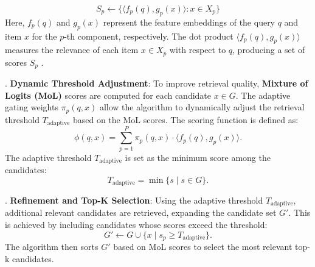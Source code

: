 \documentclass[review]{jair}
\begin{document}
\begin{equation}
S_p \gets  \{ \langle f_p(q), g_p(x) \rangle : x \in X_p \}
\label{eq:initial_retrieval}
\end{equation}
Here, $f_p(q)$ and $g_p(x)$ represent the feature embeddings of the query $q$ and item $x$ for the $p$-th component, respectively. The dot product $\langle f_p(q), g_p(x) \rangle$ measures the relevance of each item $x \in X_p$ with respect to $q$, producing a set of scores $S_p$ .


. \textbf{Dynamic Threshold Adjustment}:  
To improve retrieval quality, \textbf{Mixture of Logits (MoL)} scores are computed for each candidate \(x \in G\). The adaptive gating weights \(\pi_p(q, x)\) allow the algorithm to dynamically adjust the retrieval threshold \(T_{\text{adaptive}}\) based on the MoL scores. The scoring function is defined as:
\begin{equation}
\phi(q, x) = \sum_{p=1}^{P} \pi_p(q, x) \cdot \langle f_p(q), g_p(x) \rangle.
\label{similarity_function}
\end{equation}
The adaptive threshold \(T_{\text{adaptive}}\) is set as the minimum score among the candidates:
\begin{equation}
T_{\text{adaptive}} = \min\{s \mid s \in G\}.
\end{equation}

. \textbf{Refinement and Top-K Selection}:  
Using the adaptive threshold \(T_{\text{adaptive}}\), additional relevant candidates are retrieved, expanding the candidate set \(G'\). This is achieved by including candidates whose scores exceed the threshold:
\begin{equation}
G' \leftarrow G \cup \{x \mid s_p \geq T_{\text{adaptive}}\}.
\end{equation}
The algorithm then sorts \(G'\) based on MoL scores to select the most relevant top-k candidates.
\end{document}
